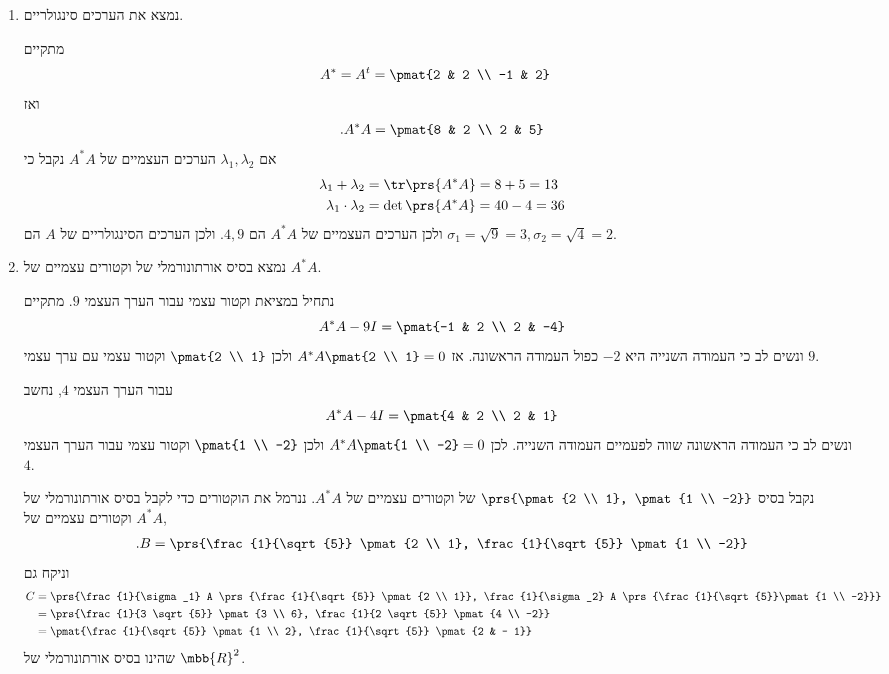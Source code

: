 \documentclass[a4paper,10pt,twoside,openany]{book}
\begin{document}
\begin{solution}
\begin{enumerate}
\item נמצא את הערכים סינגולריים.

מתקיים
\begin{align*}
A^* &= A^t = \pmat{2 & 2 \\ -1 & 2}
\end{align*}
ואז
\begin{align*}
\text{.} A^* A = \pmat{8 & 2 \\ 2 & 5}
\end{align*}
אם
$\lambda_1, \lambda_2$
הערכים העצמיים של
$A^* A$
נקבל כי
\begin{align*}
\lambda_1 + \lambda_2 &= \tr\prs{A^* A} = 8 + 5 = 13 \\
\lambda_1 \cdot \lambda_2 &= \det\prs{A^* A} = 40 - 4 = 36
\end{align*}
ולכן הערכים העצמיים של
$A^* A$
הם
$4,9$.
ולכן הערכים הסינגולריים של
$A$
הם
$\sigma_1 = \sqrt{9} = 3, \sigma_2 = \sqrt{4} = 2$.

\item
נמצא בסיס אורתונורמלי של וקטורים עצמיים של
$A^* A$.

נתחיל במציאת וקטור עצמי עבור הערך העצמי
$9$.
מתקיים
\[A^* A - 9I = \pmat{-1 & 2 \\ 2 & -4}\]
ונשים לב כי העמודה השנייה היא
$-2$
כפול העמודה הראשונה. אז
$A^* A \pmat{2 \\ 1} = 0$
ולכן
$\pmat{2 \\ 1}$
וקטור עצמי עם ערך עצמי
$9$.

עבור הערך העצמי
$4$,
נחשב
\[A^* A - 4I = \pmat{4 & 2 \\ 2 & 1}\]
ונשים לב כי העמודה הראשונה שווה לפעמיים העמודה השנייה. לכן
$A^* A \pmat{1 \\ -2} = 0$
ולכן
$\pmat{1 \\ -2}$
וקטור עצמי עבור הערך העצמי
$4$.

נקבל בסיס
$\prs{\pmat{2 \\ 1}, \pmat{1 \\ -2}}$
של וקטורים עצמיים של
$A^* A$.
ננרמל את הוקטורים כדי לקבל בסיס אורתונורמלי של וקטורים עצמיים של
$A^* A$,
\begin{align*}
\text{.} B = \prs{\frac{1}{\sqrt{5}} \pmat{2 \\ 1}, \frac{1}{\sqrt{5}} \pmat{1 \\ -2}}
\end{align*}
וניקח גם
\begin{align*}
C &= \prs{\frac{1}{\sigma_1} A \prs{\frac{1}{\sqrt{5}} \pmat{2 \\ 1}}, \frac{1}{\sigma_2} A \prs{\frac{1}{\sqrt{5}}\pmat{1 \\ -2}}}
\\&= \prs{\frac{1}{3 \sqrt{5}} \pmat{3 \\ 6}, \frac{1}{2 \sqrt{5}} \pmat{4 \\ -2}}
\\&= \pmat{\frac{1}{\sqrt{5}} \pmat{1 \\ 2}, \frac{1}{\sqrt{5}} \pmat{2 & - 1}}
\end{align*}
שהינו בסיס אורתונורמלי של
$\mbb{R}^2$.


\end{enumerate}
\end{solution}
\end{document}
